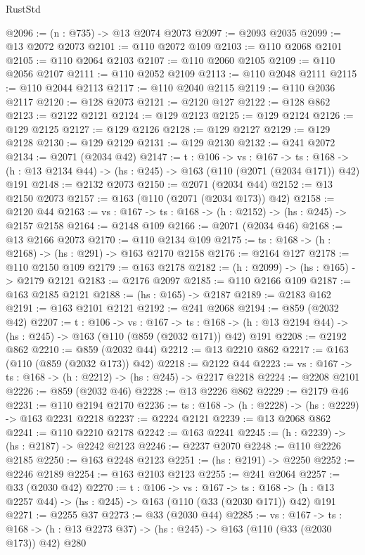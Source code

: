 \begin{lexlean}{RustStd}
\begin{coremodule}
@2096 := (n : @735) -> @13 @2074 @2073
@2097 := @2093 @2035
@2099 := @13 @2072 @2073
@2101 := @110 @2072 @109
@2103 := @110 @2068 @2101
@2105 := @110 @2064 @2103
@2107 := @110 @2060 @2105
@2109 := @110 @2056 @2107
@2111 := @110 @2052 @2109
@2113 := @110 @2048 @2111
@2115 := @110 @2044 @2113
@2117 := @110 @2040 @2115
@2119 := @110 @2036 @2117
@2120 := @128 @2073
@2121 := @2120 @127
@2122 := @128 @862
@2123 := @2122 @2121
@2124 := @129 @2123
@2125 := @129 @2124
@2126 := @129 @2125
@2127 := @129 @2126
@2128 := @129 @2127
@2129 := @129 @2128
@2130 := @129 @2129
@2131 := @129 @2130
@2132 := @241 @2072
@2134 := @2071 (@2034 @42)
@2147 := {t : @106} ->
  {vs : @167} ->
  {ts : @168} -> (h : @13 @2134 @44) -> (hs : @245) -> @163 (@110 (@2071 (@2034 @171)) @42) @191
@2148 := @2132 @2073
@2150 := @2071 (@2034 @44)
@2152 := @13 @2150 @2073
@2157 := @163 (@110 (@2071 (@2034 @173)) @42)
@2158 := @2120 @44
@2163 := {vs : @167} -> {ts : @168} -> (h : @2152) -> (hs : @245) -> @2157 @2158
@2164 := @2148 @109
@2166 := @2071 (@2034 @46)
@2168 := @13 @2166 @2073
@2170 := @110 @2134 @109
@2175 := {ts : @168} -> (h : @2168) -> (hs : @291) -> @163 @2170 @2158
@2176 := @2164 @127
@2178 := @110 @2150 @109
@2179 := @163 @2178
@2182 := (h : @2099) -> (hs : @165) -> @2179 @2121
@2183 := @2176 @2097
@2185 := @110 @2166 @109
@2187 := @163 @2185 @2121
@2188 := (hs : @165) -> @2187
@2189 := @2183 @162
@2191 := @163 @2101 @2121
@2192 := @241 @2068
@2194 := @859 (@2032 @42)
@2207 := {t : @106} ->
  {vs : @167} ->
  {ts : @168} -> (h : @13 @2194 @44) -> (hs : @245) -> @163 (@110 (@859 (@2032 @171)) @42) @191
@2208 := @2192 @862
@2210 := @859 (@2032 @44)
@2212 := @13 @2210 @862
@2217 := @163 (@110 (@859 (@2032 @173)) @42)
@2218 := @2122 @44
@2223 := {vs : @167} -> {ts : @168} -> (h : @2212) -> (hs : @245) -> @2217 @2218
@2224 := @2208 @2101
@2226 := @859 (@2032 @46)
@2228 := @13 @2226 @862
@2229 := @2179 @46
@2231 := @110 @2194 @2170
@2236 := {ts : @168} -> (h : @2228) -> (hs : @2229) -> @163 @2231 @2218
@2237 := @2224 @2121
@2239 := @13 @2068 @862
@2241 := @110 @2210 @2178
@2242 := @163 @2241
@2245 := (h : @2239) -> (hs : @2187) -> @2242 @2123
@2246 := @2237 @2070
@2248 := @110 @2226 @2185
@2250 := @163 @2248 @2123
@2251 := (hs : @2191) -> @2250
@2252 := @2246 @2189
@2254 := @163 @2103 @2123
@2255 := @241 @2064
@2257 := @33 (@2030 @42)
@2270 := {t : @106} ->
  {vs : @167} ->
  {ts : @168} -> (h : @13 @2257 @44) -> (hs : @245) -> @163 (@110 (@33 (@2030 @171)) @42) @191
@2271 := @2255 @37
@2273 := @33 (@2030 @44)
@2285 := {vs : @167} ->
  {ts : @168} -> (h : @13 @2273 @37) -> (hs : @245) -> @163 (@110 (@33 (@2030 @173)) @42) @280

\end{coremodule}
\end{lexlean}
